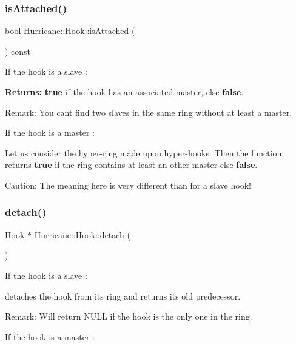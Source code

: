 \subsubsection{\texorpdfstring{is\+Attached()}{isAttached()}}
{\footnotesize\ttfamily bool Hurricane\+::\+Hook\+::is\+Attached (\begin{DoxyParamCaption}{ }\end{DoxyParamCaption}) const}

If the hook is a slave \+:

{\bfseries Returns\+:} {\bfseries true} if the hook has an associated master, else {\bfseries false}.

\begin{DoxyParagraph}{Remark\+: You can\textquotesingle{}t find two slaves in the same ring without at least a }
master.
\end{DoxyParagraph}
If the hook is a master \+:

Let us consider the hyper-\/ring made upon hyper-\/hooks. Then the function returns {\bfseries true} if the ring contains at least an other master else {\bfseries false}.

\begin{DoxyParagraph}{Caution\+: The meaning here is very different than for a slave hook! }

\end{DoxyParagraph}
\mbox{\label{classHurricane_1_1Hook_a83f5beb5092e97947d24bd18adb33db1}} 
\subsubsection{\texorpdfstring{detach()}{detach()}}
{\footnotesize\ttfamily \mbox{\hyperlink{classHurricane_1_1Hook}{Hook}} $\ast$ Hurricane\+::\+Hook\+::detach (\begin{DoxyParamCaption}{ }\end{DoxyParamCaption})}

If the hook is a slave \+:

detaches the hook from its ring and returns its old predecessor.

\begin{DoxyParagraph}{Remark\+: Will return N\+U\+LL if the hook is the only one in the ring. }

\end{DoxyParagraph}
If the hook is a master \+:

